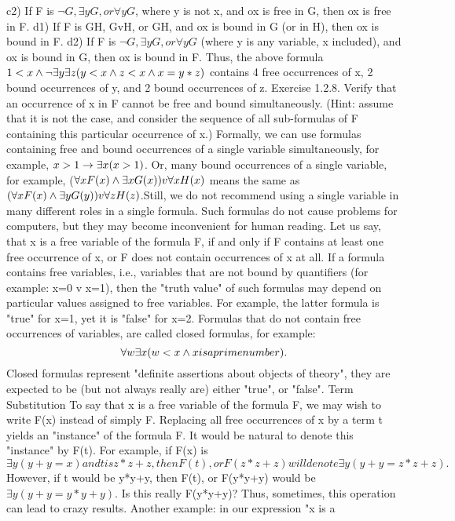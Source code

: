 c2) If F is \(\neg G, \exists yG, or \forall yG\), where y is not x, and ox is free in G, then ox is free in F.
d1) If F is G\AND H, GvH, or G\IMPLIES H, and ox is bound in G (or in H), then ox is bound in F.
d2) If F is \(\neg G, \exists yG, or \forall yG\) (where y is any variable, x included), and ox is bound in G, then ox is bound
in F.
Thus, the above formula \(1<x \wedge  \neg \exists y\exists z(y<x \wedge  z<x \wedge  x=y*z)\) contains 4 free occurrences of x, 2 bound
occurrences of y, and 2 bound occurrences of z.
Exercise 1.2.8. Verify that an occurrence of x in F cannot be free and bound simultaneously. (Hint:
assume that it is not the case, and consider the sequence of all sub-formulas of F containing this particular
occurrence of x.)
Formally, we can use formulas containing free and bound occurrences of a single variable simultaneously,
for example, \(x>1\rightarrow \exists x(x>1)\). Or, many bound occurrences of a single variable, for example, (\(\forall xF(x) \wedge 
\exists xG(x)) v \forall xH(x)\) means the same as \((\forall xF(x) \wedge  \exists yG(y)) v \forall zH(z) \).Still, we do not recommend using a
single variable in many different roles in a single formula. Such formulas do not cause problems for computers, but they may become inconvenient for human reading.
Let us say, that x is a free variable of the formula F, if and only if F contains at least one free occurrence
of x, or F does not contain occurrences of x at all.
If a formula contains free variables, i.e., variables that are not bound by quantifiers (for example: x=0 v
x=1), then the "truth value" of such formulas may depend on particular values assigned to free variables.
For example, the latter formula is "true" for x=1, yet it is "false" for x=2. Formulas that do not contain
free occurrences of variables, are called closed formulas, for example:
\[\forall w\exists x( w<x \wedge  x is a prime number).\]
Closed formulas represent "definite assertions about objects of theory", they are expected to be (but not
always really are) either "true", or "false".
Term Substitution
To say that x is a free variable of the formula F, we may wish to write F(x) instead of simply F. Replacing
all free occurrences of x by a term t yields an "instance" of the formula F. It would be natural to denote
this "instance" by F(t).
For example, if F(x) is \(\exists y(y+y=x) and t is z*z+z, then F(t), or F(z*z+z) will denote \exists y(y+y=z*z+z).\)
However, if t would be y*y+y, then F(t), or F(y*y+y) would be \(\exists y(y+y=y*y+y)\). Is this really F(y*y+y)?
Thus, sometimes, this operation can lead to crazy results. Another example: in our expression "x is a
